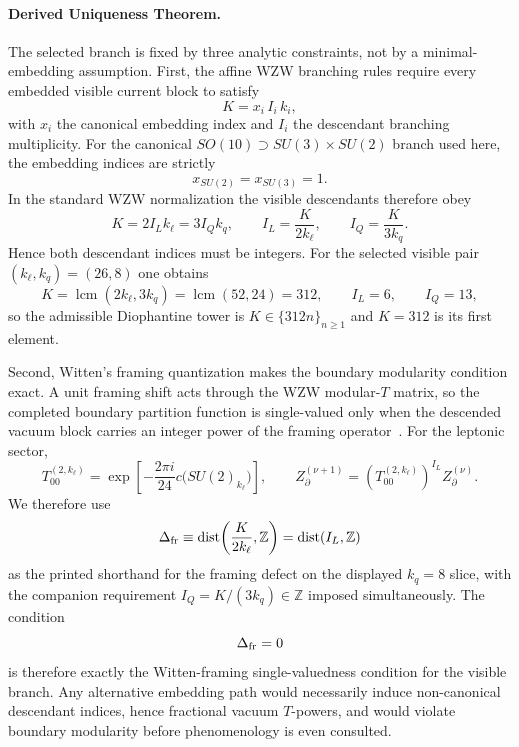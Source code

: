 \documentclass[11pt]{article}
\begin{document}
\paragraph{Derived Uniqueness Theorem.}
The selected branch is fixed by three analytic constraints, not by a minimal-embedding assumption. First, the affine WZW branching rules require every embedded visible current block to satisfy
\begin{equation}
 K=x_i\,I_i\,k_i,
\end{equation}
with $x_i$ the canonical embedding index and $I_i$ the descendant branching multiplicity. For the canonical $SO(10)\supset SU(3)\times SU(2)$ branch used here, the embedding indices are strictly
\begin{equation}
 x_{SU(2)}=x_{SU(3)}=1.
\end{equation}
In the standard WZW normalization the visible descendants therefore obey
\begin{equation}
 K=2I_Lk_{\ell}=3I_Qk_q,
 \qquad
 I_L=\frac{K}{2k_{\ell}},
 \qquad
 I_Q=\frac{K}{3k_q}.
\end{equation}
Hence both descendant indices must be integers. For the selected visible pair $(k_{\ell},k_q)=(26,8)$ one obtains
\begin{equation}
 K=\operatorname{lcm}(2k_{\ell},3k_q)=\operatorname{lcm}(52,24)=312,
 \qquad
 I_L=6,
 \qquad
 I_Q=13,
\end{equation}
so the admissible Diophantine tower is $K\in\{312n\}_{n\ge1}$ and $K=312$ is its first element.

Second, Witten's framing quantization makes the boundary modularity condition exact. A unit framing shift acts through the WZW modular-$T$ matrix, so the completed boundary partition function is single-valued only when the descended vacuum block carries an integer power of the framing operator~\cite{witten1989}. For the leptonic sector,
\begin{equation}
 T_{00}^{(2,k_{\ell})}=\exp\!\left[-\frac{2\pi i}{24}c\bigl(SU(2)_{k_{\ell}}\bigr)\right],
 \qquad
 Z_{\partial}^{(\nu+1)}=\left(T_{00}^{(2,k_{\ell})}\right)^{I_L}Z_{\partial}^{(\nu)}.
\end{equation}
We therefore use
\begin{equation}
 \Delta_{\rm fr}
 \equiv
 \operatorname{dist}\!\left(\frac{K}{2k_{\ell}},\mathbb Z\right)
 =
 \operatorname{dist}\!\left(I_L,\mathbb Z\right)
\end{equation}
as the printed shorthand for the framing defect on the displayed $k_q=8$ slice, with the companion requirement $I_Q=K/(3k_q)\in\mathbb Z$ imposed simultaneously. The condition
\begin{equation}
 \Delta_{\rm fr}=0
\end{equation}
is therefore exactly the Witten-framing single-valuedness condition for the visible branch. Any alternative embedding path would necessarily induce non-canonical descendant indices, hence fractional vacuum $T$-powers, and would violate boundary modularity before phenomenology is even consulted.
\end{document}

